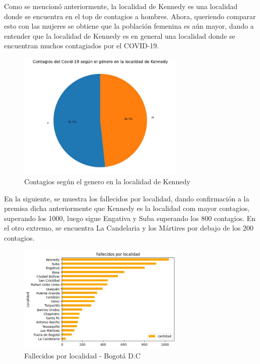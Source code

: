 \documentclass[conference,compsoc,onecolumn]{IEEEtran}
\begin{document}
\smallskip

Como se mencionó anteriormente, la localidad de Kennedy es una localidad donde se encuentra en el top de contagios a hombres. Ahora, queriendo comparar esto con las mujeres se obtiene que la población femenina es aún mayor, dando a entender que la localidad de Kennedy es en general una localidad donde se encuentran muchos contagiados por el COVID-19. 

\begin{figure}[H]
\centering  
\includegraphics[width=8cm]{./images/kennedy.jpg}
\caption{Contagios según el genero en la localidad de Kennedy}
\label{fig:mesh1}
\end{figure}

\smallskip

En la siguiente, se muestra los fallecidos por localidad, dando confirmación a la premisa dicha anteriormente que Kennedy es la localidad com mayor contagios, superando los 1000, luego sigue Engativa y Suba superando los 800 contagios. En el otro extremo, se encuentra La Candelaria y los Mártires por debajo de los 200 contagios.
\begin{figure}[H]
\centering  
\includegraphics[width=8cm]{./images/fallecidosLocalidad.jpg}
\caption{Fallecidos por localidad - Bogotá D.C}
\label{fig:mesh1}
\end{figure}
\end{document}
